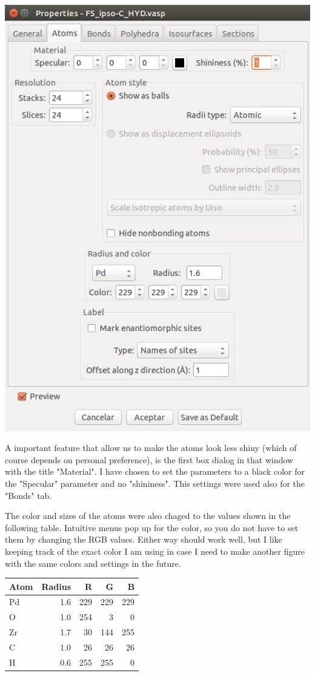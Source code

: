 \documentclass[11pt]{article}
\begin{document}
\begin{center}
\includegraphics[width=.9\linewidth]{./figures/VESTA/03_properties_atoms.png}
\end{center}

A important feature that allow us to make the atoms look less shiny (which of course depends on personal preference), is the first box dialog in that window with the title "Material". I have chosen to set the parameters to a black color for the "Specular" parameter and no "shininess". This settings were used also for the "Bonds" tab. 

The color and sizes of the atoms were also chaged to the values shown in the following table. Intuitive menus pop up for the color, so you do not have to set them by changing the RGB values. Either way should work well, but I like keeping track of the exact color I am using in case I need to make another figure with the same colors and settings in the future.

\begin{center}
\begin{tabular}{lrrrr}
Atom & Radius & R & G & B\\
\hline
Pd & 1.6 & 229 & 229 & 229\\
O & 1.0 & 254 & 3 & 0\\
Zr & 1.7 & 30 & 144 & 255\\
C & 1.0 & 26 & 26 & 26\\
H & 0.6 & 255 & 255 & 0\\
\end{tabular}
\end{center}
\end{document}
